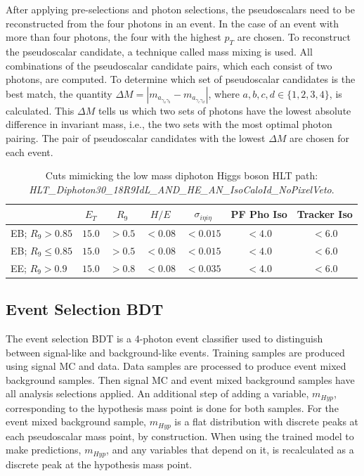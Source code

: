 \documentclass[12pt]{article}
\begin{document}
After applying pre-selections and photon selections, the pseudoscalars need to be reconstructed from the four photons in an event. In the case of an event with more than four photons, the four with the highest $p_T$ are chosen. To reconstruct the pseudoscalar candidate, a technique called mass mixing is used. All combinations of the pseudoscalar candidate pairs, which each consist of two photons, are computed. To determine which set of pseudoscalar candidates is the best match, the quantity $\Delta M = |m_{a_{\gamma_{a} \gamma_{b}}} - m_{a_{\gamma_{c} \gamma_{d}}}|$, where $a,b,c,d \in \{1,2,3,4\}$, is calculated. This $\Delta M$ tells us which two sets of photons have the lowest absolute difference in invariant mass, i.e., the two sets with the most optimal photon pairing. The pair of pseudoscalar candidates with the lowest $\Delta M$ are chosen for each event.\par

\begin{table}
   \centering
   \begin{tabular}{l|c|c|c|c|c|c}
        & $E_T$ & $R_9$ & $H/E$ & $\sigma_{i\eta i\eta}$ & PF Pho Iso & Tracker Iso\\ \hline
       EB; $R_9>0.85$ & $15.0$ & $> 0.5$ & $<0.08$ & $<0.015$ & $<4.0$ & $<6.0$\\
       EB; $R_9\leq0.85$ & $15.0$ & $> 0.5$ & $<0.08$ & $<0.015$ & $<4.0$ & $<6.0$\\
       EE; $R_9>0.9$ & $15.0$ & $> 0.8$ & $<0.08$ & $<0.035$ & $<4.0$ & $<6.0$
   \end{tabular}
   \caption{Cuts mimicking the low mass diphoton Higgs boson HLT path:\\ \textit{HLT\_Diphoton30\_18R9IdL\_AND\_HE\_AN\_IsoCaloId\_NoPixelVeto}.}
   \label{tab:hlt_cuts_2018}
\end{table}

\subsection{Event Selection BDT}
The event selection BDT is a 4-photon event classifier used to distinguish between signal-like and background-like events. Training samples are produced using signal MC and data. Data samples are processed to produce event mixed background samples. Then signal MC and event mixed background samples have all analysis selections applied. An additional step of adding a variable, $m_{Hyp}$, corresponding to the hypothesis mass point is done for both samples. For the event mixed background sample, $m_{Hyp}$ is a flat distribution with discrete peaks at each pseudoscalar mass point, by construction. When using the trained model to make predictions, $m_{Hyp}$, and any variables that depend on it, is recalculated as a discrete peak at the hypothesis mass point.\par
\end{document}
